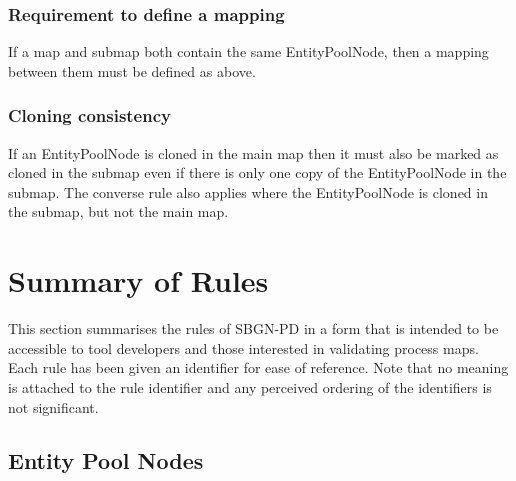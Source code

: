 \subsubsection{Requirement to define a mapping}

If a map and submap both contain the same EntityPoolNode, then a
mapping between them must be defined as above.

\subsubsection{Cloning consistency}

If an EntityPoolNode is cloned in the main map then it must also be
marked as cloned in the submap even if there is only one copy of the
EntityPoolNode in the submap. The converse rule also applies where the
EntityPoolNode is cloned in the submap, but not the main map.

\section{Summary of Rules}

This section summarises the rules of SBGN-PD in a form that is intended to be accessible to tool developers and those interested in validating process maps. Each rule has been given an identifier for ease of reference. Note that no meaning is attached to the rule identifier and any perceived ordering of the identifiers is not significant.

\subsection{Entity Pool Nodes}

